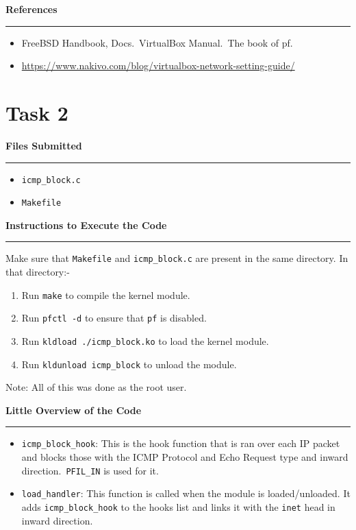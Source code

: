 \documentclass[a4paper,12pt]{article}
\newenvironment{solution}[2][]{%
\begin{mdframed}[linecolor=blue!70!black, linewidth=2pt, roundcorner=10pt, backgroundcolor=yellow!10!white, skipabove=12pt, skipbelow=12pt]%
	\textbf{\large #2}
	\par\noindent\rule{\textwidth}{0.4pt}
}{
\end{mdframed}
}
\begin{document}
\begin{solution}{References}
    \begin{itemize}
        \item FreeBSD Handbook, Docs.\ VirtualBox Manual.\ The book of pf.
        \item \url{https://www.nakivo.com/blog/virtualbox-network-setting-guide/}
    \end{itemize}
\end{solution}

\newpage

\section*{Task 2}

\begin{solution}{Files Submitted}
    \begin{itemize}
        \item \texttt{icmp\_block.c}
        \item \texttt{Makefile}
    \end{itemize}
\end{solution}

\begin{solution}{Instructions to Execute the Code}
    Make sure that \texttt{Makefile} and \texttt{icmp\_block.c} are present in the same directory. In that directory:-
    \begin{enumerate}
        \item Run \texttt{make} to compile the kernel module.
        \item Run \texttt{pfctl -d} to ensure that \texttt{pf} is disabled.
        \item Run \texttt{kldload ./icmp\_block.ko} to load the kernel module.
        \item Run \texttt{kldunload icmp\_block} to unload the module.
    \end{enumerate}
    Note: All of this was done as the root user.
\end{solution}

\begin{solution}{Little Overview of the Code}
    \begin{itemize}
        \item \texttt{icmp\_block\_hook}: This is the hook function that is ran over each IP packet and blocks those with the ICMP Protocol and Echo Request type and inward direction.\ \texttt{PFIL\_IN} is used for it.
        \item \texttt{load\_handler}: This function is called when the module is loaded/unloaded. It adds \texttt{icmp\_block\_hook} to the hooks list and links it with the \texttt{inet} head in inward direction.
    \end{itemize}
\end{solution}
\end{document}
